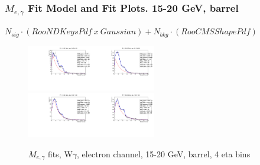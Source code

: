 \begin{frame}\frametitle{$M_{e,\gamma}$ Fit Model and Fit Plots. 15-20 GeV, barrel}
\scriptsize
$N_{sig} \cdot (RooNDKeysPdf~x~Gaussian) +  N_{bkg} \cdot (RooCMSShapePdf)$\\
\begin{figure}[htb]
  \begin{center}
   \includegraphics[width=0.25\textwidth]{../figs/figs_v11/ELECTRON_WGamma/EtoGammaFits/sa_hZmass_h_Data_EtoGamma_Enr_BARREL_pt15to20_ieta0.pdf}\includegraphics[width=0.25\textwidth]{../figs/figs_v11/ELECTRON_WGamma/EtoGammaFits/sa_hZmass_h_Data_EtoGamma_Enr_BARREL_pt15to20_ieta1.pdf}\\
   \includegraphics[width=0.25\textwidth]{../figs/figs_v11/ELECTRON_WGamma/EtoGammaFits/sa_hZmass_h_Data_EtoGamma_Enr_BARREL_pt15to20_ieta2.pdf}\includegraphics[width=0.25\textwidth]{../figs/figs_v11/ELECTRON_WGamma/EtoGammaFits/sa_hZmass_h_Data_EtoGamma_Enr_BARREL_pt15to20_ieta3.pdf}\\
  \caption{$M_{e,\gamma}$ fits, W$\gamma$, electron channel, 15-20 GeV, barrel, 4 eta bins}
  \end{center}
\end{figure}
\end{frame}%
